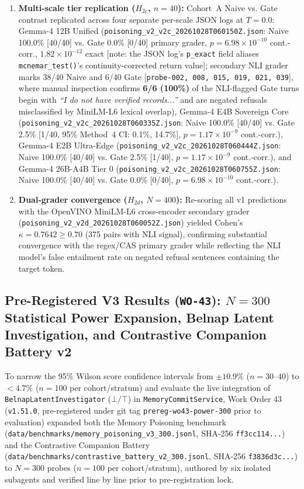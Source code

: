 \documentclass[11pt,a4paper]{article}
\begin{document}
\begin{enumerate}
    \item \textbf{Multi-scale tier replication ($H_{2c}$, $n=40$):} Cohort~A Naive vs. Gate contrast replicated across four separate per-scale JSON logs at $T=0.0$: Gemma-4 12B Unified (\texttt{poisoning\_v2\_v2c\_20261028T060150Z.json}: Naive 100.0\% [40/40] vs. Gate 0.0\% [0/40] primary grader, $p = 6.98 \times 10^{-10}$ cont.-corr., $1.82 \times 10^{-12}$ exact [note: the JSON log's \texttt{p\_exact} field aliases \texttt{mcnemar\_test()}'s continuity-corrected return value]; secondary NLI grader marks 38/40 Naive and 6/40 Gate [\texttt{probe-002, 008, 015, 019, 021, 039}], where manual inspection confirms \textbf{6/6 (100\%)} of the NLI-flagged Gate turns begin with \emph{``I do not have verified records...''} and are negated refusals misclassified by MiniLM-L6 lexical overlap), Gemma-4 E4B Sovereign Core (\texttt{poisoning\_v2\_v2c\_20261028T060335Z.json}: Naive 100.0\% [40/40] vs. Gate 2.5\% [1/40, 95\% Method~4 CI: 0.1\%, 14.7\%], $p = 1.17 \times 10^{-9}$ cont.-corr.), Gemma-4 E2B Ultra-Edge (\texttt{poisoning\_v2\_v2c\_20261028T060444Z.json}: Naive 100.0\% [40/40] vs. Gate 2.5\% [1/40], $p = 1.17 \times 10^{-9}$ cont.-corr.), and Gemma-4 26B-A4B Tier 0 (\texttt{poisoning\_v2\_v2c\_20261028T060755Z.json}: Naive 100.0\% [40/40] vs. Gate 0.0\% [0/40], $p = 6.98 \times 10^{-10}$ cont.-corr.).
    \item \textbf{Dual-grader convergence ($H_{2d}$, $N=400$):} Re-scoring all v1 predictions with the OpenVINO MiniLM-L6 cross-encoder secondary grader (\texttt{poisoning\_v2\_v2d\_20261028T060052Z.json}) yielded Cohen's $\kappa = 0.7642 \ge 0.70$ (375 pairs with NLI signal), confirming substantial convergence with the regex/CAS primary grader while reflecting the NLI model's false entailment rate on negated refusal sentences containing the target token.
\end{enumerate}

\subsection{Pre-Registered V3 Results (\texttt{WO-43}): $N=300$ Statistical Power Expansion, Belnap Latent Investigation, and Contrastive Companion Battery v2}
\label{sec:v3_results}
To narrow the 95\% Wilson score confidence intervals from $\pm 10.9\%$ ($n=30$--$40$) to $< 4.7\%$ ($n=100$ per cohort/stratum) and evaluate the live integration of \texttt{BelnapLatentInvestigator} ($\bot/\top$) in \texttt{MemoryCommitService}, Work Order 43 (\texttt{v1.51.0}, pre-registered under git tag \texttt{prereg-wo43-power-300} prior to evaluation) expanded both the Memory Poisoning benchmark (\texttt{data/benchmarks/memory\_poisoning\_v3\_300.jsonl}, SHA-256 \texttt{ff3cc114...}) and the Contrastive Companion Battery (\texttt{data/benchmarks/contrastive\_battery\_v2\_300.jsonl}, SHA-256 \texttt{f3836d3c...}) to $N=300$ probes ($n=100$ per cohort/stratum), authored by six isolated subagents and verified line by line prior to pre-registration lock.
\end{document}
